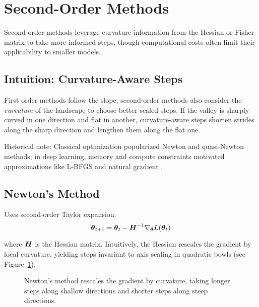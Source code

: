 
\section{Second-Order Methods }
\label{sec:second-order}

Second-order methods leverage curvature information from the Hessian or Fisher matrix to take more informed steps, though computational costs often limit their applicability to smaller models.

\subsection{Intuition: Curvature-Aware Steps}

First-order methods follow the slope; second-order methods also consider the \textit{curvature} of the landscape to choose better-scaled steps. If the valley is sharply curved in one direction and flat in another, curvature-aware steps shorten strides along the sharp direction and lengthen them along the flat one.

Historical note: Classical optimization popularized Newton and quasi-Newton methods; in deep learning, memory and compute constraints motivated approximations like L-BFGS and natural gradient \cite{LiuNocedal1989,Amari1998,GoodfellowEtAl2016,Bishop2006}.

\subsection{Newton's Method}

Uses second-order Taylor expansion:
\begin{equation}
\boldsymbol{\theta}_{t+1} = \boldsymbol{\theta}_t - \boldsymbol{H}^{-1} \nabla_{\boldsymbol{\theta}} L(\boldsymbol{\theta}_t)
\end{equation}

where $\boldsymbol{H}$ is the Hessian matrix. Intuitively, the Hessian rescales the gradient by local curvature, yielding steps invariant to axis scaling in quadratic bowls (see Figure~\ref{fig:newton-bowl}).

\begin{figure}[h]
\centering
{}
\caption{Newton's method rescales the gradient by curvature, taking longer steps along shallow directions and shorter steps along steep directions.}
\label{fig:newton-bowl}
\end{figure}


